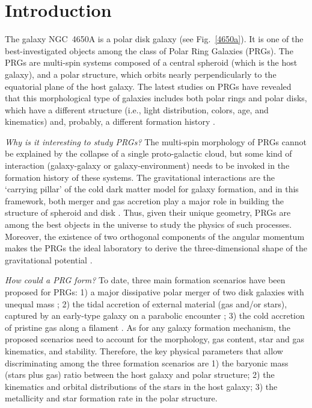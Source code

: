 \documentclass{aa}
\begin{document}

   \maketitle
%

\section{Introduction}
\label{sec:intro}

The galaxy NGC~4650A is a polar disk galaxy (see Fig.~\ref{4650a}). It
is one of the best-investigated objects among the class of Polar Ring
Galaxies (PRGs). The PRGs are multi-spin systems composed of a central
spheroid (which is the host galaxy), and a polar structure, which
orbits nearly perpendicularly to the equatorial plane of the host
galaxy. The latest studies on PRGs have revealed that this
morphological type of galaxies includes both polar rings and polar
disks, which have a different structure (i.e., light distribution,
colors, age, and kinematics) and, probably, a different formation
history \citep[see][for a review]{Iodice2014}.

{\it Why is it interesting to study PRGs?} The multi-spin morphology
of PRGs cannot be explained by the collapse of a single proto-galactic
cloud, but some kind of interaction (galaxy-galaxy or
galaxy-environment) needs to be invoked in the formation history of
these systems. The gravitational interactions are the `carrying
pillar' of the cold dark matter model for galaxy formation, and in this
framework, both merger and gas accretion play a major role in building
the structure of spheroid and disk \citep[see][as
review]{Conselice2014}. Thus, given their unique geometry, PRGs are
among the best objects in the universe to study the physics of such
processes.  Moreover, the existence of two orthogonal components of
the angular momentum makes the PRGs the ideal laboratory to derive the
three-dimensional shape of the gravitational potential \citep[see][as
reviews]{Combes2014, Arnaboldi2014}.

{\it How could a PRG form?} To date, three main formation scenarios
have been proposed for PRGs: 1) a major dissipative polar merger of
two disk galaxies with unequal mass \citep{Bekki1998, BC2003}; 2) the
tidal accretion of external material (gas and/or stars), captured by
an early-type galaxy on a parabolic encounter \citep{RS1997, BC2003,
  Hancock2009}; 3) the cold accretion of pristine gas along a filament
\citep{Maccio2006, Brook2008}. As for any galaxy formation mechanism,
the proposed scenarios need to account for the morphology, gas
content, star and gas kinematics, and stability. Therefore, the key
physical parameters that allow discriminating among the three
formation scenarios are 1) the baryonic mass (stars plus gas) ratio
between the host galaxy and polar structure; 2) the kinematics and
orbital distributions of the stars in the host galaxy; 3) the
metallicity and star formation rate in the polar structure.
\end{document}

